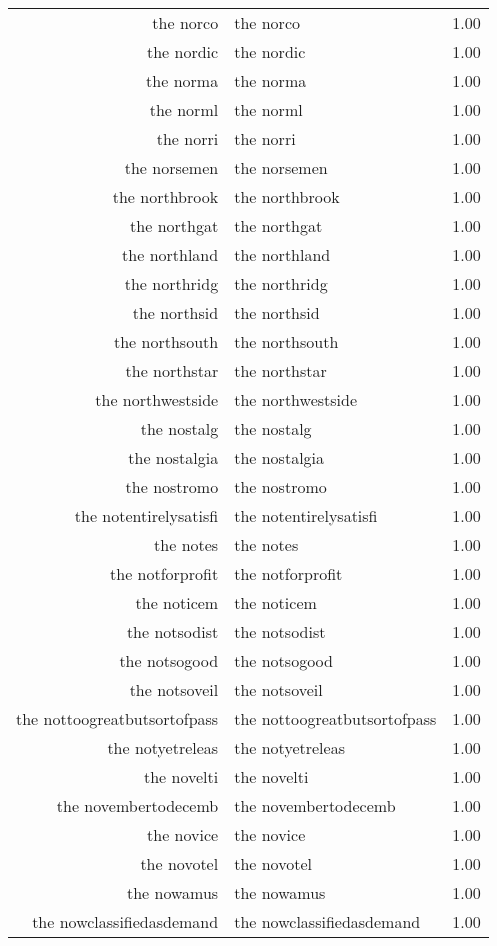 \begin{table}[ht]
\begin{tabular}{rlr}
  the norco & the norco & 1.00 \\ 
  the nordic & the nordic & 1.00 \\ 
  the norma & the norma & 1.00 \\ 
  the norml & the norml & 1.00 \\ 
  the norri & the norri & 1.00 \\ 
  the norsemen & the norsemen & 1.00 \\ 
  the northbrook & the northbrook & 1.00 \\ 
  the northgat & the northgat & 1.00 \\ 
  the northland & the northland & 1.00 \\ 
  the northridg & the northridg & 1.00 \\ 
  the northsid & the northsid & 1.00 \\ 
  the northsouth & the northsouth & 1.00 \\ 
  the northstar & the northstar & 1.00 \\ 
  the northwestside & the northwestside & 1.00 \\ 
  the nostalg & the nostalg & 1.00 \\ 
  the nostalgia & the nostalgia & 1.00 \\ 
  the nostromo & the nostromo & 1.00 \\ 
  the notentirelysatisfi & the notentirelysatisfi & 1.00 \\ 
  the notes & the notes & 1.00 \\ 
  the notforprofit & the notforprofit & 1.00 \\ 
  the noticem & the noticem & 1.00 \\ 
  the notsodist & the notsodist & 1.00 \\ 
  the notsogood & the notsogood & 1.00 \\ 
  the notsoveil & the notsoveil & 1.00 \\ 
  the nottoogreatbutsortofpass & the nottoogreatbutsortofpass & 1.00 \\ 
  the notyetreleas & the notyetreleas & 1.00 \\ 
  the novelti & the novelti & 1.00 \\ 
  the novembertodecemb & the novembertodecemb & 1.00 \\ 
  the novice & the novice & 1.00 \\ 
  the novotel & the novotel & 1.00 \\ 
  the nowamus & the nowamus & 1.00 \\ 
  the nowclassifiedasdemand & the nowclassifiedasdemand & 1.00 \\ 

\end{tabular}
\end{table}
